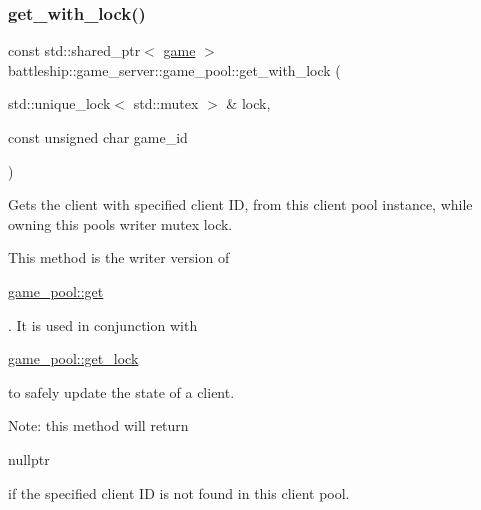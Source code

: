 \subsubsection{\texorpdfstring{get\+\_\+with\+\_\+lock()}{get\_with\_lock()}}
{\footnotesize\ttfamily const std\+::shared\+\_\+ptr$<$ \hyperlink{classbattleship_1_1game__server_1_1game}{game} $>$ battleship\+::game\+\_\+server\+::game\+\_\+pool\+::get\+\_\+with\+\_\+lock (\begin{DoxyParamCaption}\item[{std\+::unique\+\_\+lock$<$ std\+::mutex $>$ \&}]{lock,  }\item[{const unsigned char}]{game\+\_\+id }\end{DoxyParamCaption})}

Gets the client with specified client ID, from this client pool instance, while owning this pool\textquotesingle{}s writer mutex lock.

This method is the writer version of
\begin{DoxyCode}
\hyperlink{classbattleship_1_1game__server_1_1game__pool_ad6c1392c3842f1a37c762d1c27eba7d2}{game\_pool::get} 
\end{DoxyCode}
 . It is used in conjunction with
\begin{DoxyCode}
\hyperlink{classbattleship_1_1game__server_1_1game__pool_ae87384fc2dbf34f7f2769e8763c142b3}{game\_pool::get\_lock} 
\end{DoxyCode}
 to safely update the state of a client.

Note\+: this method will return
\begin{DoxyCode}
\textcolor{keyword}{nullptr} 
\end{DoxyCode}
 if the specified client ID is not found in this client pool.



